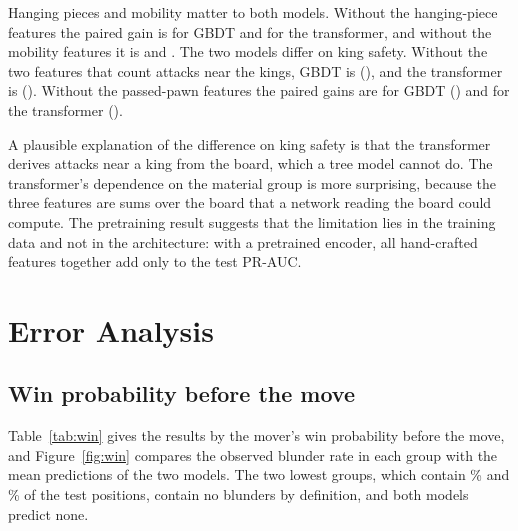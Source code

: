 \documentclass[11pt]{article}
\begin{document}
Hanging pieces and mobility matter to both models. Without the
hanging-piece features the paired gain is
 for GBDT and
 for
the transformer, and without the mobility features it is
 and
.
The two models differ on king safety. Without the two features that count
attacks near the kings, GBDT is 
(), and the transformer is
().
Without the passed-pawn features the paired gains are
 for GBDT
() and
 for
the transformer
().

A plausible explanation of the difference on king safety is that the
transformer derives attacks near a king from the board, which a tree model
cannot do. The transformer's dependence on the material group is more
surprising, because the three features are sums over the board that a network
reading the board could compute.\ifchangestart{} The pretraining result
suggests that the limitation lies in the training data and not in the
architecture: with a pretrained encoder, all hand-crafted features together
add only  to the test
PR-AUC.\fi
\fi
\fi

\section{Error Analysis}
\label{sec:error}



\iflook
\subsection{Win probability before the move}

Table~\ref{tab:win} gives the results by the mover's win probability before
the move, and Figure~\ref{fig:win} compares the observed blunder rate in each
group with the mean predictions of the two models. The two lowest groups,
which contain \% and \% of
the test positions, contain no blunders by definition, and both models
predict none.
\end{document}

